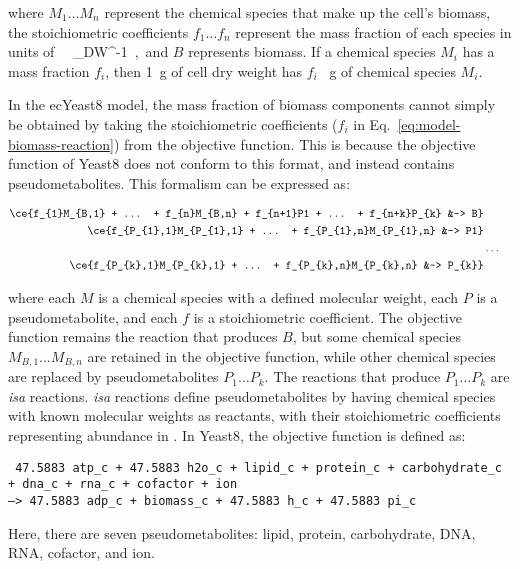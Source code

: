 where $M_{1} \ldots M_{n}$ represent the chemical species that make up the cell's biomass, the stoichiometric coefficients $f_{1} \ldots f_{n}$ represent the mass fraction of each species in units of \SI{}{\gram~\gram_{DW}^{-1}}, and $B$ represents biomass.
If a chemical species $M_{i}$ has a mass fraction $f_{i}$, then \SI{1}{\gram} of cell dry weight has $f_{i}$ \SI{}{\gram} of chemical species $M_{i}$.

In the ecYeast8 model, the mass fraction of biomass components cannot simply be obtained by taking the stoichiometric coefficients ($f_{i}$ in Eq.\ \ref{eq:model-biomass-reaction}) from the objective function.
This is because the objective function of Yeast8 does not conform to this format, and instead contains pseudometabolites.
This formalism can be expressed as:

\begin{equation}
  \begin{aligned}
    \ce{f_{1}M_{B,1} + ... + f_{n}M_{B,n} + f_{n+1}P1 + ... + f_{n+k}P_{k} &-> B}\\
    \ce{f_{P_{1},1}M_{P_{1},1} + ... + f_{P_{1},n}M_{P_{1},n} &-> P1}\\
    &\ldots\\
    \ce{f_{P_{k},1}M_{P_{k},1} + ... + f_{P_{k},n}M_{P_{k},n} &-> P_{k}}
    \label{eq:model-pseudometabolites}
  \end{aligned}
\end{equation}

where each $M$ is a chemical species with a defined molecular weight, each $P$ is a pseudometabolite, and each $f$ is a stoichiometric coefficient.
The objective function remains the reaction that produces $B$, but some chemical species $M_{B,1} \ldots M_{B,n}$ are retained in the objective function, while other chemical species are replaced by pseudometabolites $P_{1} \ldots P_{k}$.
The reactions that produce $P_{1} \ldots P_{k}$ are \textit{isa} reactions.
\textit{isa} reactions define pseudometabolites by having chemical species with known molecular weights as reactants, with their stoichiometric coefficients representing abundance in \SI{}{\mmolgdw}.
In Yeast8, the objective function is defined as:

\texttt{
  47.5883 atp\_c + 47.5883 h2o\_c + lipid\_c + protein\_c + carbohydrate\_c\\
  + dna\_c + rna\_c + cofactor + ion \\
  --> 47.5883 adp\_c + biomass\_c + 47.5883 h\_c + 47.5883 pi\_c
}

Here, there are seven pseudometabolites: lipid, protein, carbohydrate, DNA, RNA, cofactor, and ion.

